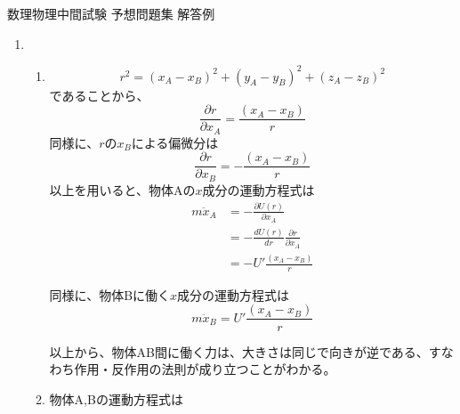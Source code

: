 \documentclass{jsarticle}
\begin{document}
\begin{center}
  {\huge 数理物理中間試験 予想問題集 解答例}\\
\end{center}

\begin{enumerate}
  \item
        \begin{enumerate}
          \item $$
                  r^2 = (x_A-x_B)^2+(y_A-y_B)^2+(z_A-z_B)^2
                $$
                であることから、
                $$
                  \frac{\partial r}{\partial x_A} = \frac{(x_A-x_B)}{r}
                $$
                同様に、$r$の$x_B$による偏微分は
                $$
                  \frac{\partial r}{\partial x_B} = -\frac{(x_A-x_B)}{r}
                $$
                以上を用いると、物体Aの$x$成分の運動方程式は
                $$
                  \begin{aligned}
                    m \ddot{x}_A & = - \frac{\partial U(r)}{\partial x_A}                \\
                                 & =- \frac{d U(r)}{d r} \frac{\partial r}{\partial x_A} \\
                                 & = -U' \frac{(x_A-x_B)}{r}
                  \end{aligned}
                $$

                同様に、物体Bに働く$x$成分の運動方程式は
                $$
                  m \ddot{x}_B = U'\frac{(x_A-x_B)}{r}
                $$

                以上から、物体AB間に働く力は、大きさは同じで向きが逆である、すなわち作用・反作用の法則が成り立つことがわかる。
          \item 物体A,Bの運動方程式は


\end{enumerate}
\end{enumerate}
\end{document}
